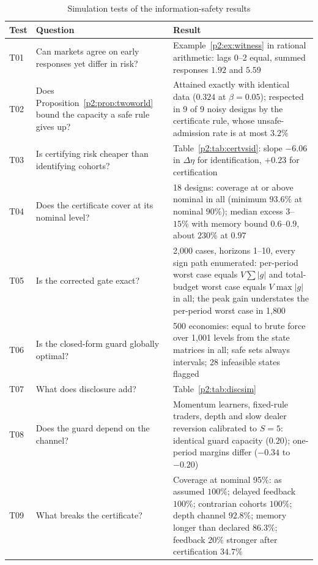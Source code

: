 \begin{table}[!tbp]\centering\footnotesize
\begin{threeparttable}
\caption{Simulation tests of the information-safety results}\label{p2:tab:simtests}
\setlength{\tabcolsep}{3pt}
\begin{tabular}{p{}p{}p{}}
\toprule
Test & Question & Result\\
\midrule
T01 & Can markets agree on early responses yet differ in risk? & Example~\ref{p2:ex:witness} in rational arithmetic: lags 0--2 equal, summed responses $1.92$ and $5.59$\\
T02 & Does Proposition~\ref{p2:prop:twoworld} bound the capacity a safe rule gives up? & Attained exactly with identical data ($0.324$ at $\beta=0.05$); respected in 9 of 9 noisy designs by the certificate rule, whose unsafe-admission rate is at most $3.2\%$\\
T03 & Is certifying risk cheaper than identifying cohorts? & Table~\ref{p2:tab:certvsid}: slope $-6.06$ in $\Delta\eta$ for identification, $+0.23$ for certification\\
T04 & Does the certificate cover at its nominal level? & 18 designs: coverage at or above nominal in all (minimum $93.6\%$ at nominal $90\%$); median excess $3$--$15\%$ with memory bound $0.6$--$0.9$, about $230\%$ at $0.97$\\
T05 & Is the corrected gate exact? & 2{,}000 cases, horizons 1--10, every sign path enumerated: per-period worst case equals $V\sum|g|$ and total-budget worst case equals $V\max|g|$ in all; the peak gain understates the per-period worst case in 1{,}800\\
T06 & Is the closed-form guard globally optimal? & 500 economies: equal to brute force over 1{,}001 levels from the state matrices in all; safe sets always intervals; 28 infeasible states flagged\\
T07 & What does disclosure add? & Table~\ref{p2:tab:discsim}\\
T08 & Does the guard depend on the channel? & Momentum learners, fixed-rule traders, depth and slow dealer reversion calibrated to $S=5$: identical guard capacity ($0.20$); one-period margins differ ($-0.34$ to $-0.20$)\\
T09 & What breaks the certificate? & Coverage at nominal 95\%: as assumed $100\%$; delayed feedback $100\%$; contrarian cohorts $100\%$; depth channel $92.8\%$; memory longer than declared $86.3\%$; feedback 20\% stronger after certification $34.7\%$\\

\end{tabular}
\end{threeparttable}
\end{table}
